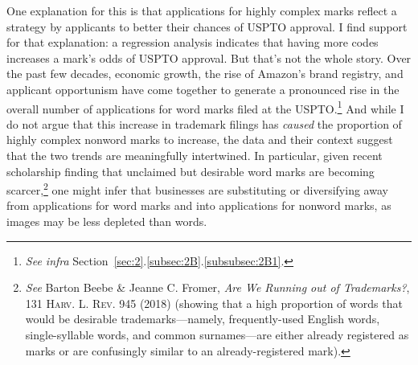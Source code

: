 \documentclass[letterpaper, 11pt, oneside]{article}
\begin{document}
One explanation for this is that applications for highly complex marks reflect a strategy by applicants to better their chances of USPTO approval. I find support for that explanation: a regression analysis indicates that having more codes increases a mark's odds of USPTO approval. But that's not the whole story. Over the past few decades, economic growth, the rise of Amazon's brand registry, and applicant opportunism have come together to generate a pronounced rise in the overall number of applications for word marks filed at the USPTO.\footnote{\textit{See infra} Section~\ref{sec:2}.\ref{subsec:2B}.\ref{subsubsec:2B1}.} And while I do not argue that this increase in trademark filings has \emph{caused} the proportion of highly complex nonword marks to increase, the data and their context suggest that the two trends are meaningfully intertwined. In particular, given recent scholarship finding that unclaimed but desirable word marks are becoming scarcer,\footnote{\label{supra4} \textit{See} Barton Beebe \& Jeanne C. Fromer, \textit{Are We Running out of Trademarks?}, 131 \textsc{Harv. L. Rev.} 945 (2018) (showing that a high proportion of words that would be desirable trademarks—namely, frequently-used English words, single-syllable words, and common surnames—are either already registered as marks or are confusingly similar to an already-registered mark).} one might infer that businesses are substituting or diversifying away from applications for word marks and into applications for nonword marks, as images may be less depleted than words.

\end{document}
